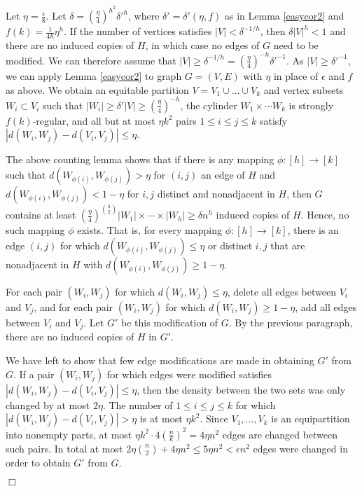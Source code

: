 \documentclass[11pt]{article}
\newenvironment{proof}
      {\medskip\noindent{\bf Proof:}\hspace{1mm}}
      {\hfill$\Box$\medskip}
\begin{document}
\begin{proof}
Let $\eta=\frac{\epsilon}{8}$. Let $\delta=\left(\frac{\eta}{4}\right)^{h^2}\delta'^{h}$, where $\delta'=\delta'(\eta,f)$ as in Lemma \ref{easycor2} and $f(k)=\frac{1}{4h}\eta^h$.  If the number of vertices satisfies $|V| < \delta^{-1/h}$, then $\delta|V|^h<1$ and there are no induced copies of $H$, in which case no edges of $G$ need to be modified. We can therefore assume that $|V| \geq \delta^{-1/h}=\left(\frac{\eta}{4}\right)^{-h}\delta'^{-1}$. 
As $|V| \geq \delta'^{-1}$, we can apply Lemma \ref{easycor2} to graph $G=(V,E)$
with $\eta$ in place of $\epsilon$ and $f$ as above. We obtain an
equitable partition $V=V_1 \cup \ldots \cup V_k$ and vertex subsets $W_i
\subset V_i$ such that $|W_i| \geq \delta' |V| \geq \left(\frac{\eta}{4}\right)^{-h}$, the cylinder $W_1 \times
\cdots W_k$ is strongly $f(k)$-regular, and all but at most $\eta k^2$ pairs $1
\leq i \leq j \leq k$ satisfy $|d(W_i,W_j)-d(V_i,V_j)| \leq \eta$.

The above counting lemma shows that if there is any mapping $\phi:[h] \rightarrow [k]$
such that $d(W_{\phi(i)},W_{\phi(j)})>\eta$ for $(i,j)$ an edge of $H$ and
$d(W_{\phi(i)},W_{\phi(j)})<1-\eta$ for $i,j$ distinct and nonadjacent in $H$,
then $G$ contains at least $\left(\frac{\eta}{4}\right)^{{h \choose 2}}|W_1| \times \cdots \times |W_h| \geq \delta n^h$ induced copies of $H$. Hence, no such
mapping $\phi$ exists. That is, for every mapping $\phi:[h] \rightarrow [k]$,
there is an edge $(i,j)$ for which  $d(W_{\phi(i)},W_{\phi(j)}) \leq \eta$ or
distinct $i,j$ that are nonadjacent in $H$ with $d(W_{\phi(i)},W_{\phi(j)})
\geq 1-\eta$.

For each pair $(W_i,W_j)$ for which $d(W_i,W_j)\leq \eta$, delete all edges
between $V_i$ and $V_j$, and for each pair $(W_i,W_j)$ for which $d(W_i,W_j)
\geq 1-\eta$, add all edges between  $V_i$ and $V_j$. Let $G'$ be this
modification of $G$. By the previous paragraph, there are no induced copies of
$H$ in $G'$.

We have left to show that few edge modifications are made in obtaining $G'$
from $G$. If a pair $(W_i,W_j)$ for which edges were modified satisfies
$|d(W_i,W_j)-d(V_i,V_j)| \leq \eta$, then the density between the two sets was
only changed by at most $2\eta$. The number of $ 1\leq i \leq j \leq k$ for which $|d(W_i,W_j)-d(V_i,V_j)| > \eta$ is at most $\eta k^2$. Since $V_1,\ldots,V_k$ is an equipartition into nonempty parts, at most $\eta k^2 \cdot 4\left(\frac{n}{k}\right)^2=4 \eta n^2$ edges are changed between such pairs. In total at most $2\eta{n \choose 2}+ 4\eta n^2 \leq 5\eta n^2 < \epsilon n^2$ edges were changed in order to obtain $G'$ from $G$.


\end{proof}
\end{document}
